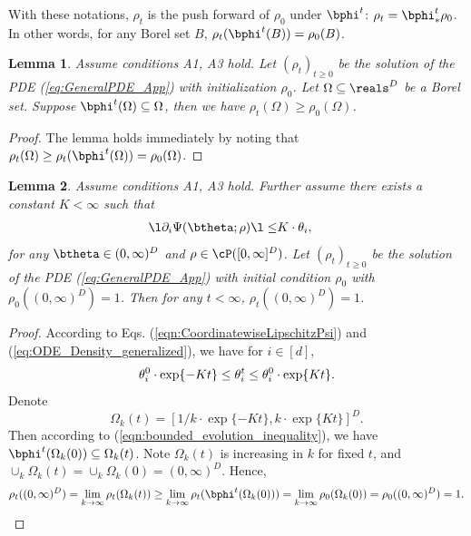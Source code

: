 \documentclass[11pt]{article}
\newtheorem{lemma}{Lemma}
\begin{document}
With these notations, $\rho_t$ is the push forward of $\rho_0$ under $\bphi^t$: $\rho_t = \bphi_*^t\rho_0$.
In other words, for any Borel set $B$, $\rho_t(\bphi^t(B)) = \rho_0(B)$. 




\begin{lemma}\label{lem:MassIncreasing}
Assume conditions {\sf A1}, {\sf A3} hold. Let $(\rho_t)_{t\ge 0}$ be the solution of the PDE (\ref{eq:GeneralPDE_App}) with initialization $\rho_0$. Let $\Omega \subseteq \reals^D$ be a Borel set. Suppose $\bphi^t(\Omega) \subseteq \Omega$, then we have $\rho_t(\Omega) \ge \rho_0(\Omega)$. 
\end{lemma}

\begin{proof}
The lemma holds immediately by noting that $\rho_t(\Omega) \ge \rho_t(\bphi^t(\Omega)) = \rho_0(\Omega)$. 
\end{proof}




\begin{lemma}\label{lemma:Density_generalized}
Assume conditions {\sf A1}, {\sf A3} hold. Further assume there exists a constant $K < \infty$ such that
\begin{align}\label{eqn:CoordinatewiseLipschitzPsi}
\l \partial_i \Psi(\btheta; \rho) \l \le & K \cdot \theta_i,
\end{align}
for any $\btheta \in (0, \infty)^D$ and $\rho \in \cP([0, \infty]^D)$. Let $(\rho_t)_{t\ge 0}$ be the solution of the PDE (\ref{eq:GeneralPDE_App}) with initial condition $\rho_0$ with $\rho_0((0, \infty)^D) = 1$. Then for any $t < \infty$, $\rho_t((0, \infty)^D) = 1$. 
\end{lemma}

\begin{proof}

According to Eqs. (\ref{eqn:CoordinatewiseLipschitzPsi}) and (\ref{eq:ODE_Density_generalized}), we have for $i \in [d]$, 
\begin{equation}\label{eqn:bounded_evolution_inequality}
\theta_{i}^0 \cdot \exp\{ - K t \} \le \theta_{i}^t \le \theta_{i}^0 \cdot \exp\{ Kt\}. \\
\end{equation}
Denote 
\begin{equation}
\Omega_k(t) = [1/k \cdot \exp\{ -Kt \}, k \cdot \exp\{Kt\} ]^D.
\end{equation}
Then according to (\ref{eqn:bounded_evolution_inequality}), we have $\bphi^t(\Omega_k(0)) \subseteq \Omega_k(t)$. Note $\Omega_k(t)$ is increasing in $k$ for fixed $t$, and $\cup_{k} \Omega_k(t) = \cup_{k} \Omega_k(0) = (0, \infty)^D$. Hence, 
\begin{align}
\rho_t((0, \infty)^D) = \lim_{k \to \infty} \rho_t( \Omega_k(t)) \ge \lim_{k \to \infty} \rho_t(\bphi^t(\Omega_k(0))) = \lim_{k \to \infty} \rho_0(\Omega_k(0)) = \rho_0((0, \infty)^D) = 1. 
\end{align}
\end{proof}
\end{document}
